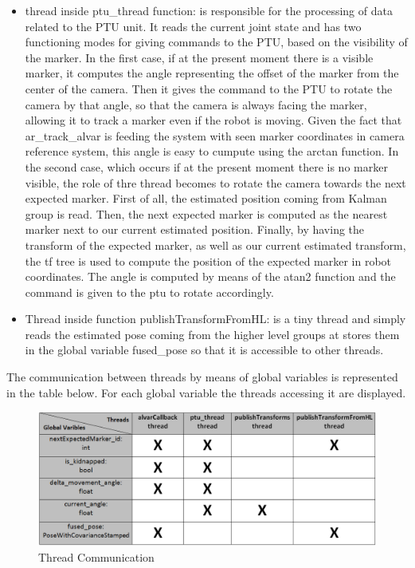 \begin{itemize}
\item thread inside ptu\_thread function: is responsible for the processing of data related to the PTU unit. It reads the current joint state and has two functioning modes for giving commands to the PTU, based on the visibility of the marker. In the first case, if at the present moment  there is a visible marker, it computes the angle representing the offset of the marker from the center of the camera. Then it gives the command to the PTU to rotate the camera by that angle, so that the camera is always facing the marker, allowing it to track a marker even if the robot is moving. Given the fact that ar\_track\_alvar is feeding the system with seen marker coordinates in camera reference system, this angle is easy to cumpute using the arctan function. In the second case, which occurs if at the present moment there is no marker visible, the role of thre thread becomes to rotate the camera towards the next expected marker. First of all, the estimated position coming from Kalman group is read. Then,  the next expected marker is computed as the nearest marker next to our current estimated position. Finally, by having the transform of the expected marker, as well as our current estimated transform, the tf tree is used to compute the position of the expected marker in robot coordinates. The angle is computed by means of the atan2 function and the command is given to the ptu to rotate accordingly.
\item Thread inside function publishTransformFromHL: is a tiny thread and simply reads the estimated pose coming from the higher level groups at stores them in the global variable fused\_pose so that it is accessible to other threads.
\end{itemize}

The communication between threads by means of global variables is represented in the table below. For each global variable the threads accessing it are displayed.

\begin{figure}
\begin{center}
\includegraphics[width = \linewidth]{graphics/vision_threads.png}
\caption{Thread Communication}
\label{Thread Communication}
\end{center}
\end{figure}



